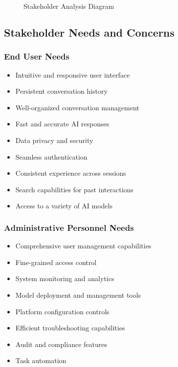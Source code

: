 \begin{figure}
    \centering
    \caption{Stakeholder Analysis Diagram}
    \label{fig:stakeholder-analysis}
\end{figure}

\subsection{Stakeholder Needs and Concerns}

\subsubsection*{End User Needs}
\begin{itemize}
   \item Intuitive and responsive user interface
   \item Persistent conversation history
   \item Well-organized conversation management
   \item Fast and accurate AI responses
   \item Data privacy and security
   \item Seamless authentication
   \item Consistent experience across sessions
   \item Search capabilities for past interactions
   \item Access to a variety of AI models
\end{itemize}

\subsubsection*{Administrative Personnel Needs}
\begin{itemize}
   \item Comprehensive user management capabilities
   \item Fine-grained access control
   \item System monitoring and analytics
   \item Model deployment and management tools
   \item Platform configuration controls
   \item Efficient troubleshooting capabilities
   \item Audit and compliance features
   \item Task automation
\end{itemize}

